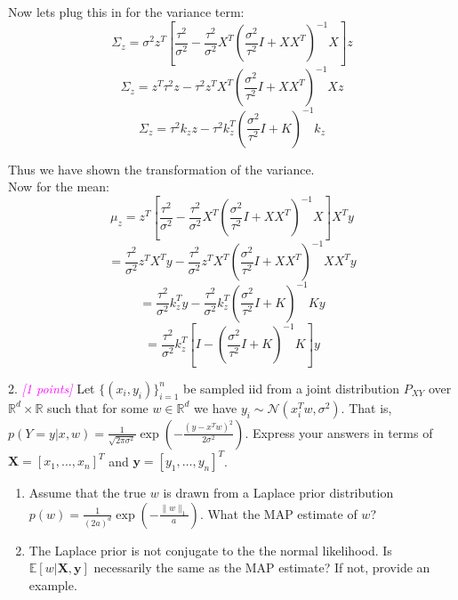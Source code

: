 \documentclass{article}
\newcommand{\field}[1]{\mathbb{#1}}
\newcommand{\mb}[1]{\mathbf{#1}}
\newcommand{\1}{\mathbf{1}}
\newcommand{\E}{\mathbb{E}} %
\newcommand{\R}{\field{R}} %
\newcommand{\grade}[1]{\small\textcolor{magenta}{\emph{[#1 points]}} \normalsize}
\begin{document}
Now lets plug this in for the variance term:
$$\Sigma_z = \sigma^2 z^T [ \frac{\tau^2}{\sigma^2} - \frac{\tau^2}{\sigma^2} X^T( \frac{\sigma^2}{\tau^2} I + X X^T )^{-1} X  ] z$$
$$\Sigma_z =  z^T  \tau^2  z    -           \tau^2 z^T X^T( \frac{\sigma^2}{\tau^2} I + X X^T )^{-1} X  z$$
$$\Sigma_z =   \tau^2 k_zz   -           \tau^2 k_z^T ( \frac{\sigma^2}{\tau^2} I + K )^{-1} k_z  $$

Thus we have shown the transformation of the variance. \\

Now for the mean: 
$$\mu_z = z^T [ \frac{\tau^2}{\sigma^2} - \frac{\tau^2}{\sigma^2} X^T( \frac{\sigma^2}{\tau^2} I + X X^T )^{-1} X  ]  X^T y $$
$$  = \frac{\tau^2}{\sigma^2} z^T X^T y    - \frac{\tau^2}{\sigma^2} z^T X^T( \frac{\sigma^2}{\tau^2} I + X X^T )^{-1} X X^T y $$
$$  = \frac{\tau^2}{\sigma^2} k_z^T y    - \frac{\tau^2}{\sigma^2} k_z^T ( \frac{\sigma^2}{\tau^2} I + K )^{-1} K y $$
$$  = \frac{\tau^2}{\sigma^2} k_z^T [ I -  ( \frac{\sigma^2}{\tau^2} I + K )^{-1} K ]  y $$


\newpage 


































2. \grade{1} Let $\{(x_i,y_i)\}_{i=1}^n$ be sampled iid from a joint distribution $P_{XY}$ over $\R^d \times \R$ such that for some $w \in \R^d$ we have $y_i \sim \mathcal{N}(x_i^T w,\sigma^2)$. That is, $p(Y =y | x, w) = \frac{1}{\sqrt{2\pi\sigma^2}} \exp(-\frac{(y-x^T w)^2}{2\sigma^2})$. Express your answers in terms of $\mb{X} = [x_1,\dots,x_n]^T$ and $\mb{y} = [y_1,\dots,y_n]^T$.
\begin{enumerate}
  \item Assume that the true $w$ is drawn from a Laplace prior distribution $p(w) = \frac{1}{(2a)^d} \exp(-\frac{\|w\|_1}{a})$. What the MAP estimate of $w$?
  \item The Laplace prior is not conjugate to the the normal likelihood. Is $\E[w | \mb{X}, \mb{y} ]$ necessarily the same as the MAP estimate? If not, provide an example.  
\end{enumerate}
\end{document}
